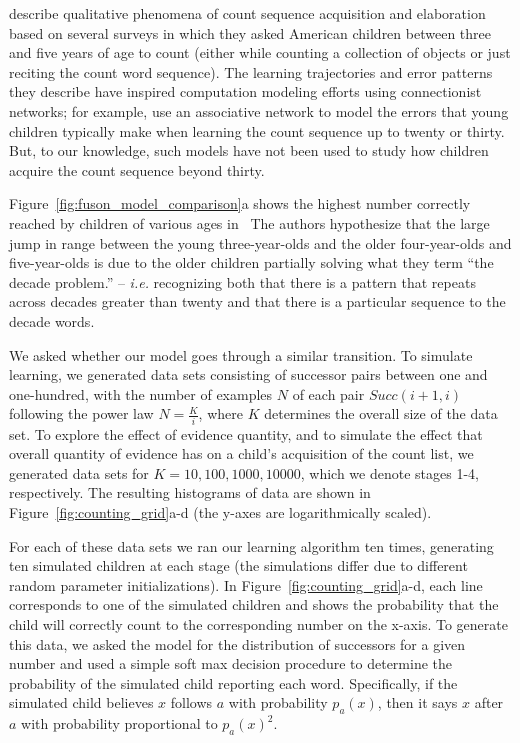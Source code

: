 \documentclass[10pt,letterpaper]{article}
\begin{document}
\cite{FusRicBriar1982} describe qualitative phenomena of
count sequence acquisition and elaboration based on several surveys in
which they asked American children between three and five years of age
to count (either while counting a collection of objects or just
reciting the count word sequence). The learning trajectories and
error patterns they describe have inspired computation modeling
efforts using connectionist networks; for example,
\citet{ma1989modeling} use an associative network to model the errors
that young children typically make when learning the count sequence up
to twenty or thirty. But, to our knowledge, such models have not been
used to study how children acquire the count sequence beyond thirty.


Figure~\ref{fig:fuson_model_comparison}a shows the highest number
correctly reached by children of various ages
in~\citeauthor{FusRicBriar1982} The authors hypothesize that the large
jump in range between the young three-year-olds and the older
four-year-olds and five-year-olds is due to the older children
partially solving what they term ``the decade problem.'' -- {\it i.e.}
recognizing both that there is a pattern that repeats across decades
greater than twenty and that there is a particular sequence to the
decade words.

We asked whether our model goes through a similar transition. To
simulate learning, we generated data sets consisting of successor
pairs between one and one-hundred, with the number of examples $N$ of each
pair $Succ(i+1, i)$ following the power law $N=\frac{K}{i}$, where $K$
determines the overall size of the data set. To explore the effect of
evidence quantity, and to simulate the effect that overall quantity
of evidence has on a child's acquisition of the count list, we
generated data sets for $K=10, 100, 1000, 10000$, which we denote
stages 1-4, respectively. The resulting histograms of data are shown in
Figure~\ref{fig:counting_grid}a-d (the y-axes are logarithmically
scaled).

For each of these data sets we ran our learning algorithm ten times,
generating ten simulated children at each stage (the simulations
differ due to different random parameter initializations). In
Figure~\ref{fig:counting_grid}a-d, each line corresponds to one of the
simulated children and shows the probability that the child will
correctly count to the corresponding number on the x-axis. To generate
this data, we asked the model for the distribution of successors for a
given number and used a simple soft max decision procedure to
determine the probability of the simulated child reporting each word.
Specifically, if the simulated child believes $x$ follows $a$
with probability $p_a(x)$, then it says $x$ after $a$ with probability
proportional to $p_a(x)^2 $.
\end{document}
